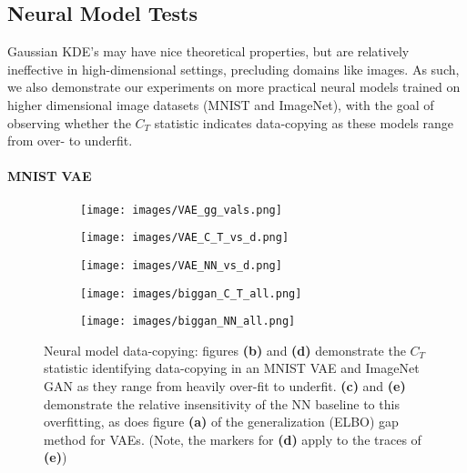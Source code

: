\subsection{Neural Model Tests}
\label{sec:neural model tests}
Gaussian KDE's may have nice theoretical properties, but are relatively ineffective in high-dimensional settings, precluding domains like images. As such, we also demonstrate our experiments on more practical neural models trained on higher dimensional image datasets (MNIST and ImageNet), with the goal of observing whether the $C_T$ statistic indicates data-copying as these models range from over- to underfit. 

\paragraph{MNIST VAE}
\begin{figure*}[h]
    \centering
    \begin{subfigure}{.27\linewidth}
        \centering
        \texttt{[image: images/VAE\_gg\_vals.png]}
        \caption{}\label{fig:vae gen gap}
    \end{subfigure}
    \hfill 
    \begin{subfigure}{.27\linewidth}
        \centering
        \texttt{[image: images/VAE\_C\_T\_vs\_d.png]}
        \caption{}\label{fig:vae C_T vs d}
    \end{subfigure}
        \hfill
    \begin{subfigure}{.27\linewidth}
        \centering
        \texttt{[image: images/VAE\_NN\_vs\_d.png]}
        \caption{}\label{fig:vae NN vs d}
    \end{subfigure}
        \hfill
    \begin{subfigure}{.27\linewidth}
        \centering
        \texttt{[image: images/biggan\_C\_T\_all.png]}
    \caption{}\label{fig:biggan C_T score}
    \end{subfigure}
        \quad 
    \begin{subfigure}{.27\linewidth}
        \centering
        \texttt{[image: images/biggan\_NN\_all.png]}
        \caption{}\label{fig:biggan NN}
    \end{subfigure}
    \caption{Neural model data-copying: figures \textbf{(b)} and \textbf{(d)} demonstrate the $C_T$ statistic identifying data-copying in an MNIST VAE and ImageNet GAN as they range from heavily over-fit to underfit. \textbf{(c)} and \textbf{(e)} demonstrate the relative insensitivity of the NN baseline to this overfitting, as does figure \textbf{(a)} of the generalization (ELBO) gap method for VAEs. (Note, the markers for \textbf{(d)} apply to the traces of \textbf{(e)})}
    \label{fig:neural experiments}
\end{figure*}

